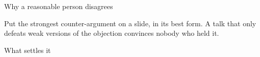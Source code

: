 
\begin{frame}{Why a reasonable person disagrees}
  \begin{pullquote}
  Put the strongest counter-argument on a slide, in its best form. A talk that only defeats
  weak versions of the objection convinces nobody who held it.
  \end{pullquote}
\end{frame}

\begin{frame}{What settles it}
\end{frame}
